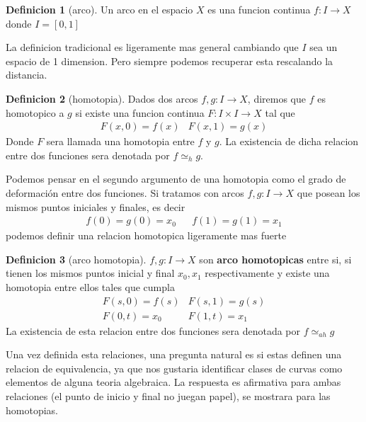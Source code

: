 \documentclass[letterpaper]{article}
\theoremstyle{definition}
\newtheorem{definicion}{Definicion}
\theoremstyle{plain}
\theoremstyle{plain}
\theoremstyle{remark}
\begin{document}
\begin{definicion}[arco]
  Un arco en el espacio \(X\) es una funcion continua \(f : I \to X \)
  donde \(I = [0,1]\)
\end{definicion}
La definicion tradicional es ligeramente mas general cambiando que \(I\)
sea un espacio de 1 dimension. Pero siempre podemos recuperar esta
rescalando la distancia.

\begin{definicion}[homotopia]
  Dados dos arcos \(f,g : I \to X\), diremos que \(f\) es homotopico a
  \(g\) si existe una funcion continua \(F : I \times I \to X \) tal que
  \[ \begin{matrix}
      F (x, 0) = f(x) & F (x, 1) = g(x)
     \end{matrix}
  \]
  Donde \(F\) sera llamada una homotopia entre \(f\) y \(g\). La
  existencia de dicha relacion entre dos funciones sera denotada por \(f
  \simeq_{h} g\).
\end{definicion}
Podemos pensar en el segundo argumento de una homotopia como el grado de
deformación entre dos funciones.
Si tratamos con arcos \(f,g : I \to X\) que posean los mismos puntos
iniciales y finales, es decir
\[ \begin{matrix}
    f(0) = g(0) = x_0  & & f(1) = g(1) = x_1
   \end{matrix}
\]
podemos definir una relacion homotopica ligeramente mas fuerte
\begin{definicion}[arco homotopia]
  \(f,g : I \to X\) son \textbf{arco homotopicas} entre si, si tienen los mismos
  puntos inicial y final \(x_0, x_1\) respectivamente y existe una homotopia entre
  ellos tales que cumpla
  \[
    \begin{matrix}
      F(s,0) = f(s) & F(s,1) = g(s) \\
      F(0,t) = x_0  & F(1,t) = x_1
    \end{matrix}
  \]
  La existencia de esta relacion entre dos funciones sera denotada por
  \(f \simeq_{ah} g\)
\end{definicion}
Una vez definida esta relaciones, una pregunta natural es si estas definen
una relacion de equivalencia, ya que nos gustaria identificar clases de
curvas como elementos de alguna teoria algebraica. La respuesta es
afirmativa para ambas relaciones (el punto de inicio y final no juegan
papel), se mostrara para las homotopias.
\end{document}
